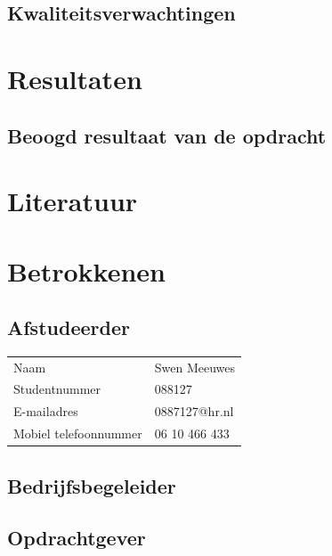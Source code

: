 \documentclass{report}
\makeatletter
\newcommand{\name}{Swen Meeuwes}
\newcommand{\studentnumber}{088127}
\newcommand{\email}{0887127@hr.nl}
\newcommand{\mobilephone}{06 10 466 433}
\makeatother
\begin{document}
\section{Kwaliteitsverwachtingen}


\chapter{Resultaten}

\section{Beoogd resultaat van de opdracht}


\chapter{Literatuur}




\nocite{Lorem}


\chapter{Betrokkenen}

\section*{Afstudeerder}
\begin{table}[h]
\begin{tabular}{ll}
Naam & \name \\
Studentnummer & \studentnumber \\
E-mailadres & \email \\
Mobiel telefoonnummer & \mobilephone
\end{tabular}
\end{table}

\section*{Bedrijfsbegeleider}

\section*{Opdrachtgever}
\end{document}
